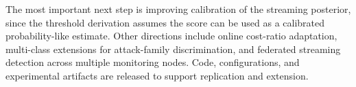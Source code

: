 \documentclass[preprint,12pt,authoryear]{elsarticle}
\begin{document}
The most important next step is improving calibration of the streaming posterior, since the threshold derivation assumes the score can be used as a calibrated probability-like estimate. Other directions include online cost-ratio adaptation, multi-class extensions for attack-family discrimination, and federated streaming detection across multiple monitoring nodes. Code, configurations, and experimental artifacts are released to support replication and extension.




\end{document}
